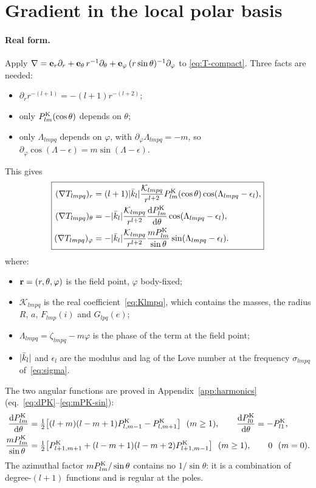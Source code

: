 \section{Gradient in the local polar basis}\label{sec:polar}
\paragraph{Real form.} Apply $\nabla=\mathbf e_r\partial_r+\mathbf e_\theta\,r^{-1}\partial_\theta+\mathbf e_\varphi\,(r\sin\theta)^{-1}\partial_\varphi$ to \eqref{eq:T-compact}. Three facts are needed:
\begin{itemize}
  \item $\partial_r r^{-(l+1)}=-(l+1)r^{-(l+2)}$;
  \item only $P^{\mathrm K}_{lm}(\cos\theta)$ depends on $\theta$;
  \item only $\Lambda_{lmpq}$ depends on $\varphi$, with $\partial_\varphi\Lambda_{lmpq}=-m$, so $\partial_\varphi\cos(\Lambda-\epsilon)=m\sin(\Lambda-\epsilon)$.
\end{itemize}
This gives
\begin{equation}
  \boxed{\begin{aligned}
  (\nabla T_{lmpq})_r&=(l+1)|\bar k_l|\frac{\mathcal K_{lmpq}}{r^{l+2}}P^{\mathrm K}_{lm}(\cos\theta)\cos(\Lambda_{lmpq}-\epsilon_l),\\
  (\nabla T_{lmpq})_\theta&=-|\bar k_l|\frac{\mathcal K_{lmpq}}{r^{l+2}}\frac{\mathrm{d}P^{\mathrm K}_{lm}}{\mathrm{d}\theta}\cos(\Lambda_{lmpq}-\epsilon_l),\\
  (\nabla T_{lmpq})_\varphi&=-|\bar k_l|\frac{\mathcal K_{lmpq}}{r^{l+2}}\frac{mP^{\mathrm K}_{lm}}{\sin\theta}\sin(\Lambda_{lmpq}-\epsilon_l).
  \end{aligned}} \label{eq:grad-polar-real}
\end{equation}
where:
\begin{itemize}
  \item $\mathbf r=(r,\theta,\varphi)$ is the field point, $\varphi$ body-fixed;
  \item $\mathcal K_{lmpq}$ is the real coefficient~\eqref{eq:Klmpq}, which contains the masses, the radius $R$, $a$, $F_{lmp}(i)$ and $G_{lpq}(e)$;
  \item $\Lambda_{lmpq}=\zeta_{lmpq}-m\varphi$ is the phase of the term at the field point;
  \item $|\bar k_l|$ and $\epsilon_l$ are the modulus and lag of the Love number at the frequency $\sigma_{lmpq}$ of~\eqref{eq:sigma}.
\end{itemize}
The two angular functions are proved in Appendix~\ref{app:harmonics} (eq.~\eqref{eq:dPK}--\eqref{eq:mPK-sin}):
\begin{align}
  \frac{\dd\PK_{lm}}{\dd\theta}&=\tfrac12\big[(l+m)(l-m+1)\PK_{l,m-1}-\PK_{l,m+1}\big]\ \ (m\ge1),\qquad \frac{\dd\PK_{l0}}{\dd\theta}=-\PK_{l1}, \label{eq:dPK-main}\\
  \frac{m\PK_{lm}}{\sin\theta}&=\tfrac12\big[\PK_{l+1,m+1}+(l-m+1)(l-m+2)\PK_{l+1,m-1}\big]\ \ (m\ge1),\qquad 0\ \ (m=0). \label{eq:mPK-main}
\end{align}
The azimuthal factor $mP^{\mathrm K}_{lm}/\sin\theta$ contains no $1/\sin\theta$: it is a combination of degree-$(l+1)$ functions and is regular at the poles.

